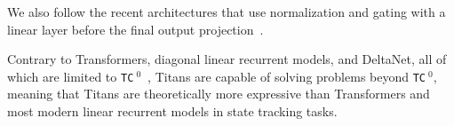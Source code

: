  We also follow the recent architectures that use normalization and gating with a linear layer before the final output projection~\citep{mehta2023long}. 


\begin{theorem}
    Contrary to Transformers, diagonal linear recurrent models, and DeltaNet, all of which are limited to \texttt{TC}$\:^0$~\citep{merrill2024the}, Titans are capable of solving problems beyond \texttt{TC}$\:^0$, meaning that Titans are theoretically more expressive than Transformers and most modern linear recurrent models in state tracking tasks. 
\end{theorem}

